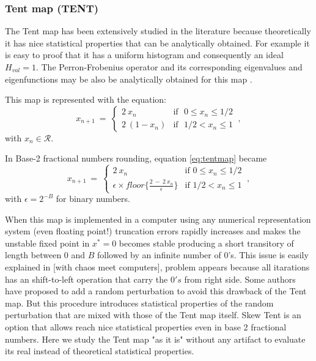 \subsubsection{Tent map (TENT)} \label{sssec:tent}

The Tent map has been extensively studied in the literature because theoretically it has nice  statistical properties that can be analytically obtained. For example it is easy to proof that it has a uniform histogram and consequently an ideal $H_{val}=1$. The Perron-Frobenius operator and its corresponding eigenvalues and eigenfunctions may be also be analytically obtained for this map \cite{tent}. 

This map is represented with the equation:
\begin{equation}\label{eq:tentmap}
x_{n+1}~=~ \left\{ \begin{array}{ll}
2~{x_n} & \textrm{if ~$0\leq x_n\leq 1/2$}\\
2~(1-{x_n}) & \textrm{if ~$1/2<x_n\leq 1$} 
\end{array} \right.  \ ,
\end{equation}
with $x_n\in\mathcal{R}$.

In Base-2 fractional numbers rounding, equation \ref{eq:tentmap} became
\begin{equation}\label{eq:tentdecbin}
x_{n+1}~=~ \left\{ \begin{array}{ll}
2~{x_n} & \textrm{if $0\leq x_n\leq 1/2$}\\
\epsilon \times floor\{\frac{2~-~2~x_n}{\epsilon}\} & \textrm{if $1/2<x_n\leq 1$} 
\end{array} \right.  \ ,
\end{equation}
with $\epsilon=2^{-B}$ for binary numbers.

When this map is implemented in a computer using any numerical representation system (even floating point!) truncation errors rapidly increases and makes the unstable fixed point in $x^*=0$ becomes stable producing a short transitory of length between $0$ and $B$ followed by an infinite number of  $0$'s\cite{Jessa1993,Callegari1997}.
This issue is easily explained in [with chaos meet computers], problem appears because all itarations has an shift-to-left operation that carry the $0's$ from right side.
Some authors \cite{buscar} have proposed to add a random perturbation to avoid this drawback of the Tent map. But this procedure introduces statistical properties of the random perturbation that are mixed with those of the Tent map itself.
Skew Tent is an option that allows reach nice statistical properties even in base 2 fractional numbers.
Here we study the Tent map "as it is" without any artifact to evaluate its real instead of theoretical statistical properties. 

